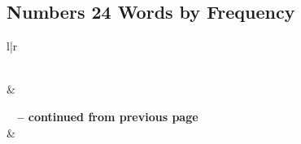 




\subsection{Numbers 24 Words by Frequency}


\normalsize
 
\begin{center}
\begin{longtable}{l|r}
\caption[Numbers 24 Words by Frequency]{Numbers 24 Words by Frequency}\label{table:WordsbyFrequency for Numbers 24} \\
\hline {} &  \\ \hline 
\endfirsthead
 
{{\bfseries \tablename\ \thetable{} -- continued from previous page}} \\  
\hline {} &  \\ \hline 
\endhead
 

\end{longtable}
\end{center}
